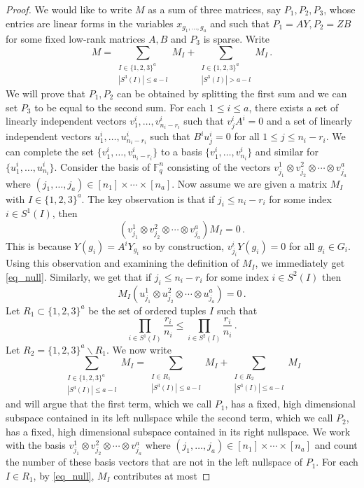\documentclass[11pt]{article}
\numberwithin{equation}{section}
\theoremstyle{definition}
\theoremstyle{plain}
\theoremstyle{definition}
\newcommand\F{{\mathbb{F}}}
\begin{document}
\begin{proof}
We would like to write $M $ as a sum of three matrices, say $P_1, P_2, P_3$, whose entries are linear forms in the variables $x_{g_1, \dots , g_a}$ and such that $P_1 = AY, P_2 = ZB$ for some fixed low-rank matrices $A,B$ and $P_3$ is sparse.  Write
\[
M = \sum_{\substack{I \in \{1,2,3 \}^a \\ |S^3(I)| \leq  a - l}}M_{I}  + \sum_{\substack{I \in \{1,2,3 \}^a \\ |S^3(I)| > a - l}}M_{I} \,.
\]
We will prove that $P_1,P_2$ can be obtained by splitting the first sum and we can set $P_3$ to be equal to the second sum.  For each $1 \leq i \leq a$, there exists a set of linearly independent vectors $v_1^i, \dots , v_{n_i - r_i}^i$ such that $v_{j}^iA^i = 0$ and a set of linearly independent vectors $u_1^i, \dots , u_{n_i - r_i}^i$ such that $B^iu_j^i = 0$ for all $1 \leq j \leq n_i - r_i$.  We can complete the set  $\{ v_1^i, \dots , v_{n_i - r_i}^i \}$ to a basis $\{ v_1^i, \dots , v_{n_i }^i \}$ and similar for $\{u_1^i, \dots , u_{n_i}^i \}$.  Consider the basis of $\F_q^{n}$ consisting of the vectors $v^1_{j_1} \otimes v^2_{j_2} \otimes \cdots \otimes v^a_{j_a}$ where $(j_1, \dots, j_a) \in [n_1] \times \cdots \times [n_a]$.  Now 
%
assume %
we are given a matrix $M_{I}$ with $I \in \{1,2,3 \}^a$.    The key observation is that if %
$j_{i} \leq n_{i} - r_{i}$ for some index $i \in S^1(I)$, %
%
then 
\begin{equation}\label{eq_null}
\left(v^1_{j_1} \otimes v^2_{j_2} \otimes \cdots \otimes v^a_{j_a}\right)M_I = 0\,.
\end{equation}
This is because $Y(g_i) = A^iY_{g_i}$ so by construction, $v^i_{j_i} Y(g_i) = 0$ for all $g_i \in G_i$.  Using this observation and examining the definition of $M_I$, we immediately get \eqref{eq_null}.  Similarly, we get that if $j_{i} \leq n_{i} - r_{i}$ for some index $i \in S^2(I)$ then 
\[
M_I\left(u^1_{j_1} \otimes u^2_{j_2} \otimes \cdots \otimes u^a_{j_a}\right) = 0 \,.
\]
Let $R_1 \subset \{1,2,3 \}^a$ be the set of ordered tuples $I$ such that 
\[
\prod_{i \in S^1(I)} \frac{r_i}{n_i} \leq \prod_{i \in S^2(I)} \frac{r_i}{n_i} \,.
\]
Let $R_2 = \{1,2,3 \}^a \backslash R_1$.  We now write
\[
\sum_{\substack{I \in \{1,2,3 \}^a \\ |S^3(I)| \leq  a - l}}M_{I} = \sum_{\substack{I \in R_1 \\ |S^3(I)| \leq  a - l}}M_{I} + \sum_{\substack{I \in R_2 \\ |S^3(I)| \leq  a - l}}M_{I}
\]
and will argue that the first term, which we call $P_1$, has a fixed, high dimensional subspace contained in its left nullspace while the second term, which we call $P_2$, has a fixed, high dimensional subspace contained in its right nullspace.  We work with the basis $v^1_{j_1} \otimes v^2_{j_2} \otimes \cdots \otimes v^a_{j_a}$ where $(j_1, \dots, j_a) \in [n_1] \times \cdots \times [n_a]$ and count the number of these basis vectors that are not in the left nullspace of $P_1$.  For each $I \in R_1$, by \eqref{eq_null}, $M_I$ contributes at most 

\end{proof}
\end{document}
